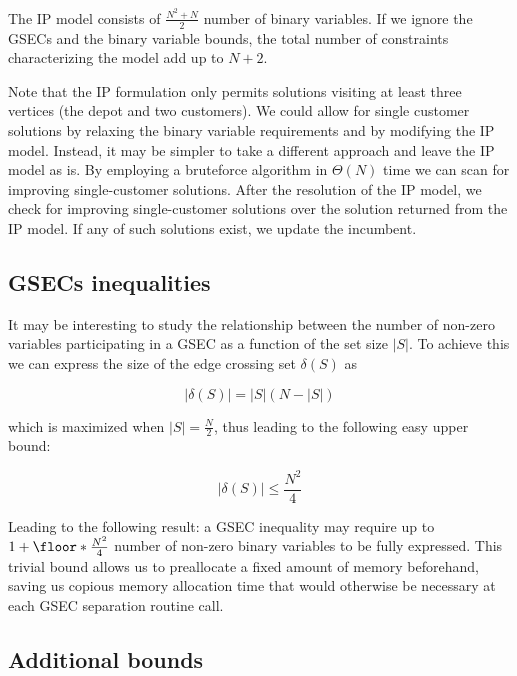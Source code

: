 The IP model consists of $\frac{N^2 + N}{2}$ number of binary variables.
If we ignore the GSECs and the binary variable bounds, the total number of constraints characterizing the model add up to $N + 2$.

Note that the IP formulation only permits solutions visiting at least three vertices (the depot and two customers).
We could allow for single customer solutions by relaxing the binary variable requirements and by modifying the IP model.
Instead, it may be simpler to take a different approach and leave the IP model as is.
By employing a bruteforce algorithm in $\Theta(N)$ time we can scan for improving single-customer solutions.
After the resolution of the IP model, we check for improving single-customer solutions over the solution returned from the IP model.
If any of such solutions exist, we update the incumbent.

\subsection{GSECs inequalities}



It may be interesting to study the relationship between the number of non-zero variables participating in a GSEC as a function of the set size $|S|$.
To achieve this we can express the size of the edge crossing set $\delta(S)$ as

\begin{equation}\label{eq:delta-s-set-size}
	|\delta(S)| = |S| (N - |S|)
\end{equation}

which is maximized when $|S| = \frac{N}{2}$, thus leading to the following easy upper bound:

\begin{equation}\label{eq:delta-s-set-size-ub}
	|\delta(S)| \le \frac{N^2}{4}
\end{equation}

Leading to the following result: a GSEC inequality may require up to $1 + \floor*{\frac{N^2}{4}}$ number of non-zero binary variables to be fully expressed.
This trivial bound allows us to preallocate a fixed amount of memory beforehand, saving us copious memory allocation time that would otherwise be necessary at each GSEC separation routine call.

\subsection{Additional bounds}

